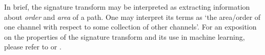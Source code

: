 \documentclass{article}
\renewcommand{\subsubsection}[1]{\textbf{#1}

} %
\newcommand{\reals}{\mathbb{R}}
\newcommand{\sig}{\mathrm{Sig}^N}
\newtheorem{theorem}{Theorem}
\begin{document}
In brief, the signature transform may be interpreted as extracting
information about \emph{order} and \emph{area} of a path.
%
One may interpret its terms as `the area/order of one channel with
respect to some collection of other channels'.
%
%
For an exposition on the properties of the signature transform and its
use in machine learning, please refer to \citet{primer2016} or \citet[Appendix A]{kidger2019deep}.
%

%

%
%
\end{document}
